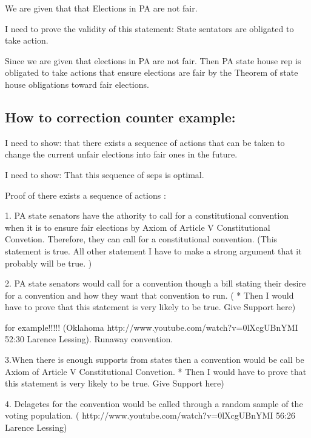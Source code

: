 \documentclass[11pt]{article} %
\begin{document}
\begin{enumerate}
We are given that that Elections in PA are not fair. 

I need to prove the validity of this statement: State sentators are obligated to take action. 

Since we are given that elections in PA are not fair.  Then  PA state house rep is obligated to take actions that ensure elections are fair by the Theorem of state house obligations toward fair elections.


\subsection{How to correction counter example:}


I need to show: that there exists a sequence of actions that can be taken to change the current unfair elections into fair ones in the future.  

I need to show: That this sequence of seps is optimal. 

Proof of there exists a sequence of actions : 


1. PA state senators have the athority to call for a constitutional convention when it is to ensure fair elections by Axiom of Article V Constitutional Convetion.  Therefore, they can call for a constitutional convention. (This statement is true.  All other statement I have to make a strong argument that it probably will be true. )

	
2. PA state senators would call for a convention though a bill stating their desire for a convention and how they want that convention to run.  ( * Then I would have to prove that this statement is very likely to be true.  Give Support here)

	for example!!!!! (Oklahoma http://www.youtube.com/watch?v=0lXcgUBnYMI  52:30   Larence Lessing).
	Runaway convention.

3.When there is enough supports from states then a convention would be call be Axiom of Article V Constitutional Convetion.   * Then I would have to prove that this statement is very likely to be true.  Give Support here)


4.   Delagetes for the convention would be called through a random sample of the voting population. ( http://www.youtube.com/watch?v=0lXcgUBnYMI  56:26   Larence Lessing)


\end{enumerate}
\end{document}
